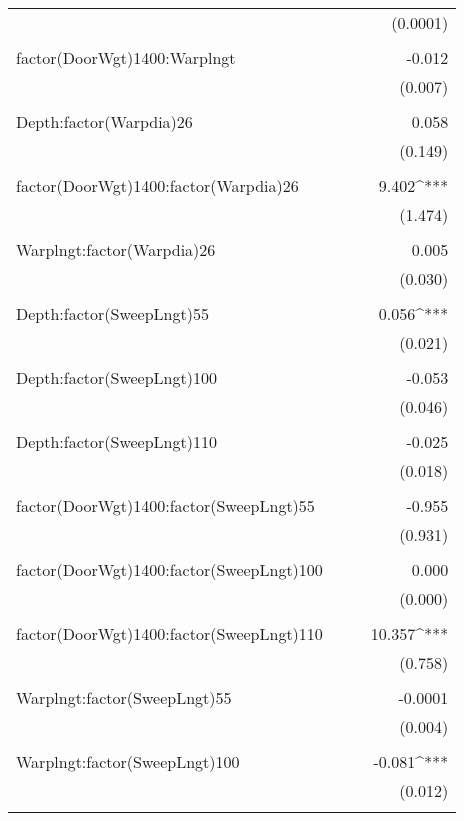 \documentclass[12pt]{article}\usepackage[]{graphicx}\usepackage[]{color}
\begin{document}
\begin{table}[H]
\begin{tabular}{@{\extracolsep{5pt}}lD{.}{.}{-3} D{.}{.}{-3} D{.}{.}{-3} }
  &  &  & (0.0001) \\ 
  & & & \\ 
 factor(DoorWgt)1400:Warplngt &  &  & -0.012 \\ 
  &  &  & (0.007) \\ 
  & & & \\ 
 Depth:factor(Warpdia)26 &  &  & 0.058 \\ 
  &  &  & (0.149) \\ 
  & & & \\ 
 factor(DoorWgt)1400:factor(Warpdia)26 &  &  & 9.402^{***} \\ 
  &  &  & (1.474) \\ 
  & & & \\ 
 Warplngt:factor(Warpdia)26 &  &  & 0.005 \\ 
  &  &  & (0.030) \\ 
  & & & \\ 
 Depth:factor(SweepLngt)55 &  &  & 0.056^{***} \\ 
  &  &  & (0.021) \\ 
  & & & \\ 
 Depth:factor(SweepLngt)100 &  &  & -0.053 \\ 
  &  &  & (0.046) \\ 
  & & & \\ 
 Depth:factor(SweepLngt)110 &  &  & -0.025 \\ 
  &  &  & (0.018) \\ 
  & & & \\ 
 factor(DoorWgt)1400:factor(SweepLngt)55 &  &  & -0.955 \\ 
  &  &  & (0.931) \\ 
  & & & \\ 
 factor(DoorWgt)1400:factor(SweepLngt)100 &  &  & 0.000 \\ 
  &  &  & (0.000) \\ 
  & & & \\ 
 factor(DoorWgt)1400:factor(SweepLngt)110 &  &  & 10.357^{***} \\ 
  &  &  & (0.758) \\ 
  & & & \\ 
 Warplngt:factor(SweepLngt)55 &  &  & -0.0001 \\ 
  &  &  & (0.004) \\ 
  & & & \\ 
 Warplngt:factor(SweepLngt)100 &  &  & -0.081^{***} \\ 
  &  &  & (0.012) \\ 
  & & & \\ 

\end{tabular}
\end{table}
\end{document}
